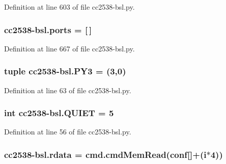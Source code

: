 Definition at line 603 of file cc2538-\/bsl.\+py.

\subsubsection[{\texorpdfstring{ports}{ports}}]{\setlength{\rightskip}{0pt plus 5cm}cc2538-\/bsl.\+ports = \mbox{[}$\,$\mbox{]}}\hypertarget{namespacecc2538-bsl_a8a91255af8966dcea1e33e65c913e155}{}\label{namespacecc2538-bsl_a8a91255af8966dcea1e33e65c913e155}


Definition at line 667 of file cc2538-\/bsl.\+py.

\subsubsection[{\texorpdfstring{P\+Y3}{PY3}}]{\setlength{\rightskip}{0pt plus 5cm}tuple cc2538-\/bsl.\+P\+Y3 = (3,0)}\hypertarget{namespacecc2538-bsl_afd1439a276d4da23475c41e75b1fa6b6}{}\label{namespacecc2538-bsl_afd1439a276d4da23475c41e75b1fa6b6}


Definition at line 63 of file cc2538-\/bsl.\+py.

\subsubsection[{\texorpdfstring{Q\+U\+I\+ET}{QUIET}}]{\setlength{\rightskip}{0pt plus 5cm}int cc2538-\/bsl.\+Q\+U\+I\+ET = 5}\hypertarget{namespacecc2538-bsl_a2fdb38475537f7360cac8166a901a13d}{}\label{namespacecc2538-bsl_a2fdb38475537f7360cac8166a901a13d}


Definition at line 56 of file cc2538-\/bsl.\+py.

\subsubsection[{\texorpdfstring{rdata}{rdata}}]{\setlength{\rightskip}{0pt plus 5cm}cc2538-\/bsl.\+rdata = cmd.\+cmd\+Mem\+Read({\bf conf}\mbox{[}\textquotesingle{}\mbox{]}+({\bf i}$\ast$4))}\hypertarget{namespacecc2538-bsl_a7c79c1799d75b3d51f698d907fd7a34a}{}\label{namespacecc2538-bsl_a7c79c1799d75b3d51f698d907fd7a34a}


